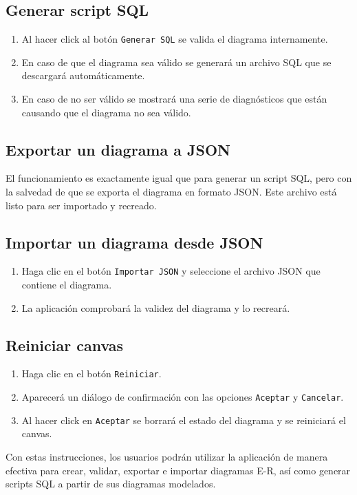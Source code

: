
\subsection{Generar script SQL}
\begin{enumerate}
    \item Al hacer click al botón \texttt{Generar SQL} se valida el diagrama internamente.
    \item En caso de que el diagrama sea válido se generará un archivo SQL que se descargará automáticamente.
    \item En caso de no ser válido se mostrará una serie de diagnósticos que están causando que el diagrama no sea válido.
\end{enumerate}


\subsection{Exportar un diagrama a JSON}
El funcionamiento es exactamente igual que para generar un script SQL, pero con la salvedad de que se exporta el diagrama en formato JSON. Este archivo está listo para ser importado y recreado.

\subsection{Importar un diagrama desde JSON}
\begin{enumerate}
    \item Haga clic en el botón \texttt{Importar JSON} y seleccione el archivo JSON que contiene el diagrama.
    \item La aplicación comprobará la validez del diagrama y lo recreará.
\end{enumerate}


\subsection{Reiniciar canvas}
\begin{enumerate}
    \item Haga clic en el botón \texttt{Reiniciar}.
    \item Aparecerá un diálogo de confirmación con las opciones \texttt{Aceptar} y \texttt{Cancelar}.
    \item Al hacer click en \texttt{Aceptar} se borrará el estado del diagrama y se reiniciará el canvas.
\end{enumerate}


Con estas instrucciones, los usuarios podrán utilizar la aplicación de manera efectiva para crear, validar, exportar e importar diagramas E-R, así como generar scripts SQL a partir de sus diagramas modelados.
